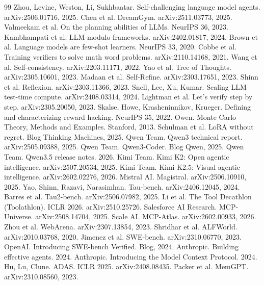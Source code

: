 \documentclass[11pt,a4paper]{article}
\begin{document}
\begin{thebibliography}{99}
 Zhou, Levine, Weston, Li, Sukhbaatar. Self-challenging language model agents. arXiv:2506.01716, 2025.
 Chen et al. DreamGym. arXiv:2511.03773, 2025.
 Valmeekam et al. On the planning abilities of LLMs. NeurIPS 36, 2023.
 Kambhampati et al. LLM-modulo frameworks. arXiv:2402.01817, 2024.
 Brown et al. Language models are few-shot learners. NeurIPS 33, 2020.
 Cobbe et al. Training verifiers to solve math word problems. arXiv:2110.14168, 2021.
 Wang et al. Self-consistency. arXiv:2203.11171, 2022.
 Yao et al. Tree of Thoughts. arXiv:2305.10601, 2023.
 Madaan et al. Self-Refine. arXiv:2303.17651, 2023.
 Shinn et al. Reflexion. arXiv:2303.11366, 2023.
 Snell, Lee, Xu, Kumar. Scaling LLM test-time compute. arXiv:2408.03314, 2024.
 Lightman et al. Let's verify step by step. arXiv:2305.20050, 2023.
 Skalse, Howe, Krasheninnikov, Krueger. Defining and characterizing reward hacking. NeurIPS 35, 2022.
 Owen. Monte Carlo Theory, Methods and Examples. Stanford, 2013.
 Schulman et al. LoRA without regret. Blog Thinking Machines, 2025.
 Qwen Team. Qwen3 technical report. arXiv:2505.09388, 2025.
 Qwen Team. Qwen3-Coder. Blog Qwen, 2025.
 Qwen Team. Qwen3.5 release notes. 2026. %
 Kimi Team. Kimi K2: Open agentic intelligence. arXiv:2507.20534, 2025.
 Kimi Team. Kimi K2.5: Visual agentic intelligence. arXiv:2602.02276, 2026.
 Mistral AI. Magistral. arXiv:2506.10910, 2025.
 Yao, Shinn, Razavi, Narasimhan. Tau-bench. arXiv:2406.12045, 2024.
 Barres et al. Tau2-bench. arXiv:2506.07982, 2025.
 Li et al. The Tool Decathlon (Toolathlon). ICLR 2026. arXiv:2510.25726.
 Salesforce AI Research. MCP-Universe. arXiv:2508.14704, 2025.
 Scale AI. MCP-Atlas. arXiv:2602.00933, 2026.
 Zhou et al. WebArena. arXiv:2307.13854, 2023.
 Shridhar et al. ALFWorld. arXiv:2010.03768, 2020.
 Jimenez et al. SWE-bench. arXiv:2310.06770, 2023.
 OpenAI. Introducing SWE-bench Verified. Blog, 2024.
 Anthropic. Building effective agents. 2024.
 Anthropic. Introducing the Model Context Protocol. 2024.
 Hu, Lu, Clune. ADAS. ICLR 2025. arXiv:2408.08435.
 Packer et al. MemGPT. arXiv:2310.08560, 2023.


\end{thebibliography}
\end{document}
